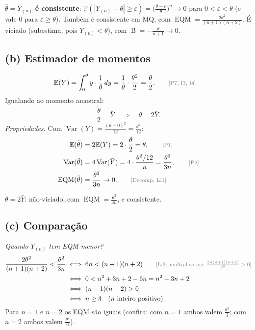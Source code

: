 \documentclass[11pt,a4paper]{article}
\newcommand{\E}{\mathbb{E}}
\newcommand{\Var}{\operatorname{Var}}
\newcommand{\EQM}{\operatorname{EQM}}
\newcommand{\B}{\operatorname{B}}
\newcommand{\Prob}{\mathbb{P}}
\newcommand{\bY}{\bar{Y}}
\newcommand{\just}[1]{\tag*{\footnotesize\textcolor{gray}{[#1]}}}
\begin{document}
\begin{resposta}
$\hat\theta=Y_{(n)}$ \textbf{é consistente}: $\Prob(|Y_{(n)}-\theta|\ge\varepsilon)=\big(\frac{\theta-\varepsilon}{\theta}\big)^n\to0$ para $0<\varepsilon<\theta$ (e vale $0$ para $\varepsilon\ge\theta$). Também é consistente em MQ, com $\EQM=\frac{2\theta^2}{(n+1)(n+2)}$. É viciado (subestima, pois $Y_{(n)}<\theta$), com $\B=-\frac{\theta}{n+1}\to0$.
\end{resposta}

\subsection*{(b) Estimador de momentos}
\begin{align*}
\E(Y)&=\int_0^\theta y\cdot\frac1\theta\,dy=\frac1\theta\cdot\frac{\theta^2}{2}=\frac\theta2 . \just{P7, I3, I4}
\end{align*}
Igualando ao momento amostral:
\[
\frac{\tilde\theta}{2}=\bY\quad\Longrightarrow\quad\tilde\theta=2\bY .
\]
\textit{Propriedades.} Com $\Var(Y)=\frac{(\theta-0)^2}{12}=\frac{\theta^2}{12}$:
\begin{align*}
\E(\tilde\theta)&=2\E(\bY)=2\cdot\frac\theta2=\theta, \just{P1}\\
\Var(\tilde\theta)&=4\Var(\bY)=4\cdot\frac{\theta^2/12}{n}=\frac{\theta^2}{3n}, \just{P2}\\
\EQM(\tilde\theta)&=\frac{\theta^2}{3n}\to0 . \just{Decomp, Li1}
\end{align*}
\begin{resposta}
$\tilde\theta=2\bY$: não-viciado, com $\EQM=\frac{\theta^2}{3n}$, e consistente.
\end{resposta}

\subsection*{(c) Comparação}
\textit{Quando $Y_{(n)}$ tem EQM menor?}
\begin{align*}
\frac{2\theta^2}{(n+1)(n+2)}<\frac{\theta^2}{3n}
&\iff6n<(n+1)(n+2) \just{Li3: multiplica por $\frac{3n(n+1)(n+2)}{\theta^2}>0$}\\
&\iff0<n^2+3n+2-6n=n^2-3n+2\\
&\iff(n-1)(n-2)>0\\
&\iff n\ge3 \quad(n\text{ inteiro positivo}).
\end{align*}
Para $n=1$ e $n=2$ os EQM são iguais (confira: com $n=1$ ambos valem $\frac{\theta^2}{3}$; com $n=2$ ambos valem $\frac{\theta^2}{6}$).
\end{document}
